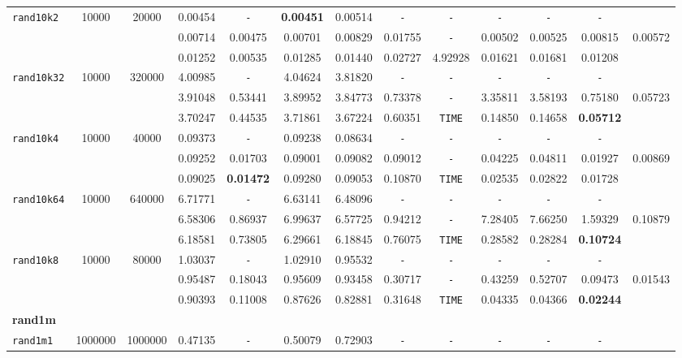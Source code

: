 \begin{table}
{\begin{tabular}{ l c c | c c c c c c c c c || c }
\hline
\verb|rand10k2| & 10000 & 20000 & 0.00454 & \verb|-| & \textbf{0.00451} & 0.00514 & \verb|-| & \verb|-| & \verb|-| & \verb|-| & \verb|-| & \\
 &  &  & 0.00714 & 0.00475 & 0.00701 & 0.00829 & 0.01755 & \verb|-| & 0.00502 & 0.00525 & 0.00815 & 0.00572 \\
 &  &  & 0.01252 & 0.00535 & 0.01285 & 0.01440 & 0.02727 & 4.92928 & 0.01621 & 0.01681 & 0.01208 & \\
\hline
\verb|rand10k32| & 10000 & 320000 & 4.00985 & \verb|-| & 4.04624 & 3.81820 & \verb|-| & \verb|-| & \verb|-| & \verb|-| & \verb|-| & \\
 &  &  & 3.91048 & 0.53441 & 3.89952 & 3.84773 & 0.73378 & \verb|-| & 3.35811 & 3.58193 & 0.75180 & 0.05723 \\
 &  &  & 3.70247 & 0.44535 & 3.71861 & 3.67224 & 0.60351 & \verb|TIME| & 0.14850 & 0.14658 & \textbf{0.05712} & \\
\hline
\verb|rand10k4| & 10000 & 40000 & 0.09373 & \verb|-| & 0.09238 & 0.08634 & \verb|-| & \verb|-| & \verb|-| & \verb|-| & \verb|-| & \\
 &  &  & 0.09252 & 0.01703 & 0.09001 & 0.09082 & 0.09012 & \verb|-| & 0.04225 & 0.04811 & 0.01927 & 0.00869 \\
 &  &  & 0.09025 & \textbf{0.01472} & 0.09280 & 0.09053 & 0.10870 & \verb|TIME| & 0.02535 & 0.02822 & 0.01728 & \\
\hline
\verb|rand10k64| & 10000 & 640000 & 6.71771 & \verb|-| & 6.63141 & 6.48096 & \verb|-| & \verb|-| & \verb|-| & \verb|-| & \verb|-| & \\
 &  &  & 6.58306 & 0.86937 & 6.99637 & 6.57725 & 0.94212 & \verb|-| & 7.28405 & 7.66250 & 1.59329 & 0.10879 \\
 &  &  & 6.18581 & 0.73805 & 6.29661 & 6.18845 & 0.76075 & \verb|TIME| & 0.28582 & 0.28284 & \textbf{0.10724} & \\
\hline
\verb|rand10k8| & 10000 & 80000 & 1.03037 & \verb|-| & 1.02910 & 0.95532 & \verb|-| & \verb|-| & \verb|-| & \verb|-| & \verb|-| & \\
 &  &  & 0.95487 & 0.18043 & 0.95609 & 0.93458 & 0.30717 & \verb|-| & 0.43259 & 0.52707 & 0.09473 & 0.01543 \\
 &  &  & 0.90393 & 0.11008 & 0.87626 & 0.82881 & 0.31648 & \verb|TIME| & 0.04335 & 0.04366 & \textbf{0.02244} & \\
\hline
\multicolumn{13}{l}{\textbf{rand1m}} \\
\hline
\verb|rand1m1| & 1000000 & 1000000 & 0.47135 & \verb|-| & 0.50079 & 0.72903 & \verb|-| & \verb|-| & \verb|-| & \verb|-| & \verb|-| & \\

\end{tabular}}
\end{table}
